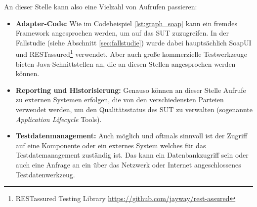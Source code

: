 An dieser Stelle kann also eine Vielzahl von Aufrufen passieren:

\begin{itemize}
\item \textbf{Adapter-Code:} Wie im Codebeispiel \ref{lst:graph_soap} kann ein fremdes Framework angesprochen werden, um auf das \Gls{SUT} zuzugreifen. In der Fallstudie (siehe Abschnitt \ref{sec:fallstudie}) wurde dabei hauptsächlich SoapUI und RESTassured\footnote{RESTassured Testing Library \url{https://github.com/jayway/rest-assured}} verwendet. Aber auch große kommerzielle Testwerkzeuge bieten Java-Schnittstellen an, die an diesen Stellen angesprochen werden können.
\item \textbf{Reporting und Historisierung:} Genauso können an dieser Stelle Aufrufe zu externen Systemen erfolgen, die von den verschiedensten Parteien verwendet werden, um den Qualitätsstatus des \Gls{SUT} zu verwalten (sogenannte \textit{Application Lifecycle} Tools). 
\item \textbf{Testdatenmanagement:} Auch möglich und oftmals sinnvoll ist der Zugriff auf eine Komponente oder ein externes System welches für das Testdatemanagement zuständig ist. Das kann ein Datenbankzugriff sein oder auch eine Anfrage an ein über das Netzwerk oder Internet angeschlossenes Testdatenwerkzeug.
\end{itemize}


